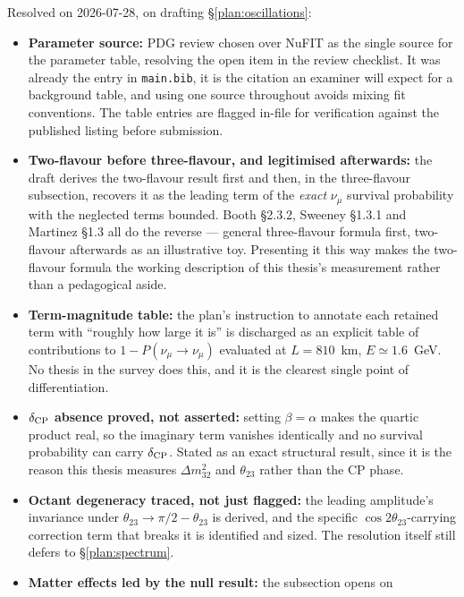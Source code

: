 \documentclass[11pt]{article}
\begin{document}
Resolved on 2026-07-28, on drafting \S\ref{plan:oscillations}:
\begin{itemize}
    \item[$\checkmark$] \textbf{Parameter source:} PDG review chosen over NuFIT as the
    single source for the parameter table, resolving the open item in the review checklist. It
    was already the entry in \texttt{main.bib}, it is the citation an examiner will expect for a
    background table, and using one source throughout avoids mixing fit conventions. The table
    entries are flagged in-file for verification against the published listing before submission.
    \item[$\checkmark$] \textbf{Two-flavour before three-flavour, and legitimised afterwards:}
    the draft derives the two-flavour result first and then, in the three-flavour subsection,
    recovers it as the leading term of the \emph{exact} $\nu_\mu$ survival probability with the
    neglected terms bounded. Booth \S2.3.2, Sweeney \S1.3.1 and Martinez \S1.3 all do the
    reverse --- general three-flavour formula first, two-flavour afterwards as an illustrative
    toy. Presenting it this way makes the two-flavour formula the working description of this
    thesis's measurement rather than a pedagogical aside.
    \item[$\checkmark$] \textbf{Term-magnitude table:} the plan's instruction to annotate each
    retained term with ``roughly how large it is'' is discharged as an explicit table of
    contributions to $1-P(\nu_\mu\to\nu_\mu)$ evaluated at $L=810$~km, $E\simeq1.6$~GeV. No thesis
    in the survey does this, and it is the clearest single point of differentiation.
    \item[$\checkmark$] \textbf{$\delta_{\rm CP}$ absence proved, not asserted:} setting $\beta=\alpha$
    makes the quartic product real, so the imaginary term vanishes identically and no survival
    probability can carry $\delta_{\rm CP}$. Stated as an exact structural result, since it is the reason
    this thesis measures $\Delta m^{2}_{32}$ and $\theta_{23}$ rather than the CP phase.
    \item[$\checkmark$] \textbf{Octant degeneracy traced, not just flagged:} the leading
    amplitude's invariance under $\theta_{23}\to\pi/2-\theta_{23}$ is derived, and the specific
    $\cos2\theta_{23}$-carrying correction term that breaks it is identified and sized. The
    resolution itself still defers to \S\ref{plan:spectrum}.
    \item[$\checkmark$] \textbf{Matter effects led by the null result:} the subsection opens on

\end{itemize}
\end{document}

